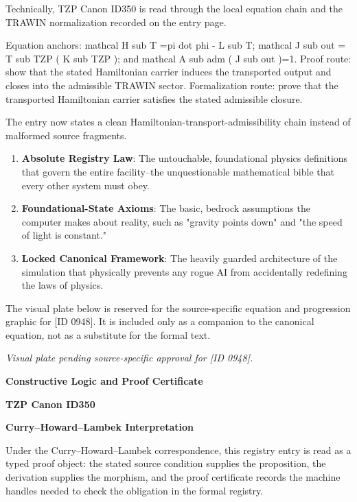 Technically, TZP Canon ID350 is read through the local equation chain and the TRAWIN normalization recorded on the entry page.

Equation anchors: mathcal H sub T =pi dot phi - L sub T; mathcal J sub out = T sub TZP ( K sub TZP ); and mathcal A sub adm ( J sub out )=1. Proof route: show that the stated Hamiltonian carrier induces the transported output and closes into the admissible TRAWIN sector. Formalization route: prove that the transported Hamiltonian carrier satisfies the stated admissible closure.

The entry now states a clean Hamiltonian-transport-admissibility chain instead of malformed source fragments.
\endgroup

\begin{enumerate}[leftmargin=1.6em,itemsep=6pt,topsep=4pt]
\item \textbf{Absolute Registry Law}: The untouchable, foundational physics definitions that govern the entire facility--the unquestionable mathematical bible that every other system must obey.
\item \textbf{Foundational-State Axioms}: The basic, bedrock assumptions the computer makes about reality, such as "gravity points down" and "the speed of light is constant."
\item \textbf{Locked Canonical Framework}: The heavily guarded architecture of the simulation that physically prevents any rogue AI from accidentally redefining the laws of physics.
\end{enumerate}

\begingroup\footnotesize\sloppy
The visual plate below is reserved for the source-specific equation and progression graphic for [ID 0948]. It is included only as a companion to the canonical equation, not as a substitute for the formal text.
\par\endgroup
\begingroup\footnotesize\itshape
Visual plate pending source-specific approval for [ID 0948].
\par\endgroup

\clearpage
\begingroup\tzpsupportsetup
\noindent\textbf{\fontsize{10.8pt}{12.8pt}\selectfont [ID 0948] Constructive Logic and Proof Certificate}\par
\noindent\textbf{\fontsize{10pt}{12pt}\selectfont TZP Canon ID350}\par
\vspace{0.45em}
\begingroup
\footnotesize
\setlength{\parskip}{0.22em}
\setlength{\parindent}{0pt}
\noindent\textbf{Curry--Howard--Lambek Interpretation}\par
Under the Curry--Howard--Lambek correspondence, this registry entry is read as a typed proof
object: the stated source condition supplies the proposition, the derivation supplies the
morphism, and the proof certificate records the machine handles needed to check the obligation
in the formal registry.

